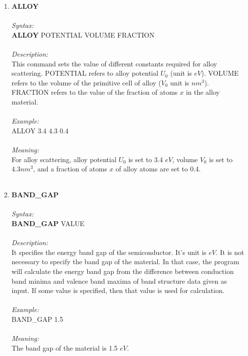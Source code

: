 \documentclass[12pt]{article}
\begin{document}
\begin{enumerate}
    \item \textbf{ALLOY} \\ \\
    \textit{Syntax:} \\
    \textbf{ALLOY} POTENTIAL VOLUME FRACTION \\ \\
    \textit{Description:} \\
    This command sets the value of different constants required for alloy scattering. POTENTIAL refers to alloy potential $U_0$ (unit is $eV$). VOLUME refers to the volume of the primitive cell of alloy ($V_0$ unit is $nm^3$). FRACTION refers to the value of the fraction of atoms $x$ in the alloy material. \\ \\
    \textit{Example:} \\ 
    ALLOY 3.4 4.3 0.4 \\ \\
    \textit{Meaning:} \\    
    For alloy scattering, alloy potential $U_0$ is set to 3.4 $eV$, volume $V_0$ is set to $4.3 nm^3$, and a fraction of atoms $x$ of alloy atoms are set to 0.4. \\ \\
  
    \item \textbf{BAND\_GAP} \\ \\
    \textit{Syntax:} \\
    \textbf{BAND\_GAP} VALUE \\ \\
    \textit{Description:} \\
    It specifies the energy band gap of the semiconductor. It’s unit is $eV$. It is not necessary to specify the band gap of the material. In that case, the program will calculate the energy band gap from the difference between conduction band minima and valence band maxima of band structure data given as input. If some value is specified, then that value is used for calculation. \\ \\
    \textit{Example:} \\
    BAND\_GAP 1.5 \\ \\
    \textit{Meaning:} \\  
    The band gap of the material is 1.5 $eV$. \\ \\


\end{enumerate}
\end{document}
